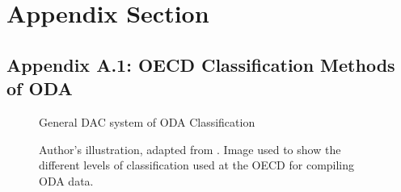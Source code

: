 \appendix
\section*{Appendix Section}


\subsection*{Appendix A.1: OECD Classification Methods of ODA}

\begin{figure}[ht]
\captionsetup{justification=justified,singlelinecheck=false}
\caption{General DAC system of ODA Classification}
    \label{fig:General ODA classification}
    \caption*{\footnotesize{Author's illustration, adapted from \textcite{oecd_Data_2023}. Image used to show the different levels of classification used at the OECD for compiling ODA data.}}
\end{figure}

